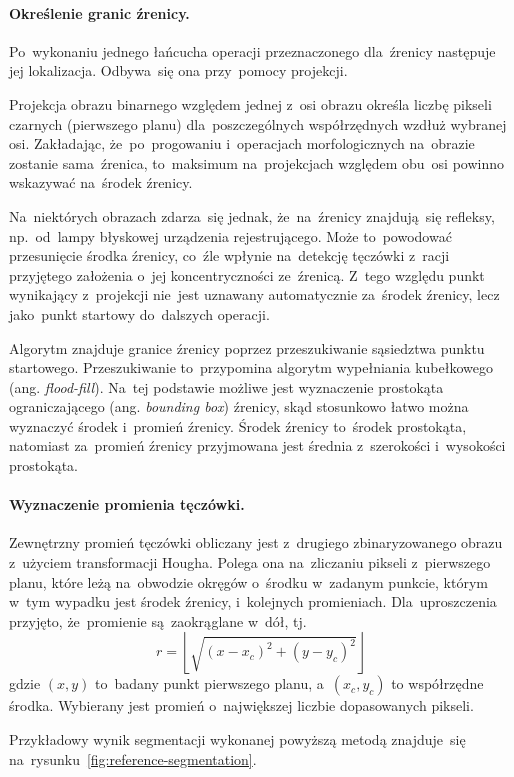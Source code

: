 \documentclass[11pt,a4paper]{article}
\begin{document}
\paragraph{Określenie granic źrenicy.}

Po~wykonaniu jednego łańcucha operacji przeznaczonego dla~źrenicy następuje jej lokalizacja.
Odbywa~się ona przy~pomocy projekcji.

Projekcja obrazu binarnego względem jednej z~osi obrazu określa liczbę pikseli czarnych (pierwszego planu) dla~poszczególnych współrzędnych wzdłuż wybranej osi.
Zakładając, że~po~progowaniu i~operacjach morfologicznych na~obrazie zostanie sama~źrenica, to~maksimum na~projekcjach względem obu~osi powinno wskazywać na~środek źrenicy.

Na~niektórych obrazach zdarza~się jednak, że~na~źrenicy znajdują~się refleksy, np.~od~lampy błyskowej urządzenia rejestrującego.
Może to~powodować przesunięcie środka źrenicy, co~źle wpłynie na~detekcję tęczówki z~racji przyjętego założenia o~jej koncentryczności ze~źrenicą.
Z~tego względu punkt wynikający z~projekcji nie~jest uznawany automatycznie za~środek źrenicy, lecz jako~punkt startowy do~dalszych operacji.

Algorytm znajduje granice źrenicy poprzez przeszukiwanie sąsiedztwa punktu startowego.
Przeszukiwanie to~przypomina algorytm wypełniania kubełkowego (ang. \emph{flood-fill}).
Na~tej podstawie możliwe jest wyznaczenie prostokąta ograniczającego (ang. \emph{bounding box}) źrenicy, skąd stosunkowo łatwo można wyznaczyć środek i~promień źrenicy.
Środek źrenicy to~środek prostokąta, natomiast za~promień źrenicy przyjmowana jest średnia z~szerokości i~wysokości prostokąta.

\paragraph{Wyznaczenie promienia tęczówki.}
Zewnętrzny promień tęczówki obliczany jest z~drugiego zbinaryzowanego obrazu z~użyciem transformacji Hougha.
Polega ona na~zliczaniu pikseli z~pierwszego planu, które leżą na~obwodzie okręgów o~środku w~zadanym punkcie, którym w~tym wypadku jest środek źrenicy, i~kolejnych promieniach.
Dla~uproszczenia przyjęto, że~promienie są~zaokrąglane w~dół, tj.
$$ r = \left\lfloor \sqrt{(x - x_c)^2 + (y - y_c)^2} \right\rfloor $$
gdzie $(x, y)$ to~badany punkt pierwszego planu, a~$(x_c, y_c)$ to współrzędne środka.
Wybierany jest promień o~największej liczbie dopasowanych pikseli.

Przykładowy wynik segmentacji wykonanej powyższą metodą znajduje~się na~rysunku~\ref{fig:reference-segmentation}.
\end{document}
